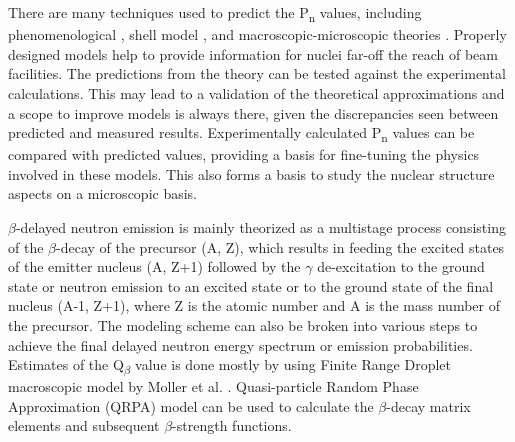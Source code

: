 \documentclass[a4paper,12pt,twoside]{report}
\begin{document}
There are many techniques used to predict the P\textsubscript{n} values, including phenomenological \cite{Phenomenoliogical}, shell model \cite{shellmodelhalflives}, and macroscopic-microscopic theories \cite{pmollermacroscopic}. Properly designed models help to provide information for nuclei far-off the reach of beam facilities. The predictions from the theory can be tested against the experimental calculations. This may lead to a validation of the theoretical approximations and a scope to improve models is always there, given the discrepancies seen between predicted and measured results. Experimentally calculated P\textsubscript{n} values can be compared with predicted values, providing a basis for fine-tuning the physics involved in these models. This also forms a basis to study the nuclear structure aspects on a microscopic basis. 

 $\beta$-delayed neutron emission is mainly theorized as a multistage process consisting of the $\beta$-decay of the precursor (A, Z), which results in feeding the excited states of the emitter nucleus (A, Z+1) followed by the $\gamma$ de-excitation to the ground state or neutron emission to an excited state or to the ground state of the final nucleus (A-1, Z+1), where Z is the atomic number and A is the mass number of the precursor. The modeling scheme can also be broken into various steps to achieve the final delayed neutron energy spectrum or emission probabilities. Estimates of the Q\textsubscript{$\beta$} value is done mostly by using Finite Range Droplet macroscopic model by Moller et al. \cite{FRDMmoller}. Quasi-particle Random Phase Approximation (QRPA) model can be used to calculate the $\beta$-decay matrix elements and subsequent $\beta$-strength functions.  
 
\end{document}
